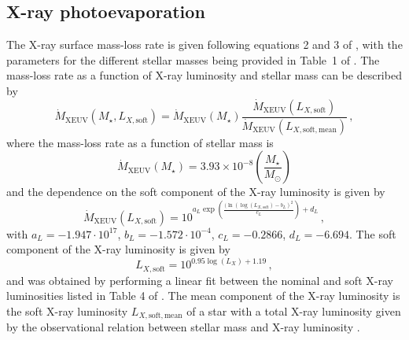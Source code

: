 \documentclass[fleqn,usenatbib]{mnras}
\begin{document}
\subsection{X-ray photoevaporation}

The X-ray surface mass-loss rate is given following equations 2 and 3 of \citet{Picogna2019}, 
with the parameters for the different stellar masses being provided in Table~1 of \citet{Picogna2021}. The mass-loss rate as a function of X-ray luminosity and stellar mass can be described by \citep{Ercolano2021,Picogna2021}
\begin{equation}
    \dot{M}_\mathrm{XEUV}(M_\star, L_{X,\mathrm{soft}}) = \dot{M}_\mathrm{XEUV}(M_\star)\frac{\dot{M}_\mathrm{XEUV}(L_{X,\mathrm{soft}})}{\dot{M}_\mathrm{XEUV}(L_{X,\mathrm{soft, mean}})} \,,
\end{equation}
where the mass-loss rate as a function of stellar mass is 
\begin{equation}
    \dot{M}_\mathrm{XEUV}(M_\star) = 3.93\times10^{-8} \left(\frac{M_\star}{M_\odot}\right)
\end{equation}
and the dependence on the soft component of the X-ray luminosity is given by
\begin{equation}
    \dot{M}_\mathrm{XEUV}(L_{X,\mathrm{soft}}) = 10^{a_L \exp{\left(\frac{(\ln(\log(L_{X,\mathrm{soft}})-b_L)^2}{c_L}\right)+d_L}} \,,
\end{equation}
with $a_L = -1.947\cdot 10^{17}$, $b_L = -1.572\cdot 10^{-4}$, $c_L = -0.2866$, $d_L = -6.694$. The soft component of the X-ray luminosity is given by
\begin{equation}
    L_{X,\mathrm{soft}} = 10^{0.95 \log{(L_X)}+1.19} \,,
\end{equation}
and was obtained by performing a linear fit between the nominal and soft X-ray luminosities listed in Table 4 of \citet{Ercolano2021}.
The mean component of the X-ray luminosity is the soft X-ray luminosity $L_{X,\mathrm{soft, mean}}$ of a star with a total X-ray luminosity given by the observational relation between stellar mass and X-ray luminosity \citep[see eq.~\ref{eq:LxMstar}, ][]{Gudel2007}.
 
\end{document}
